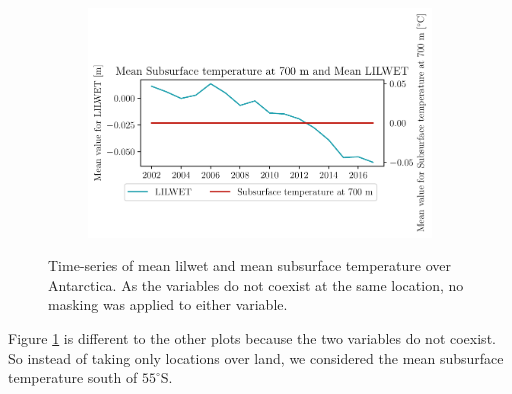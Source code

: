 \documentclass[../main.tex]{subfiles}
\begin{document}
\begin{figure}[hbt!]
\begin{subfigure}[b]{0.45\textwidth}
    \end{subfigure}
    \begin{subfigure}[b]{0.45\textwidth}
    \includegraphics[width=\textwidth]{images/2021w5/chapter7/hres/tiemseries_subsurtemp_700_LIC}
    \end{subfigure}
    \caption{Time-series of mean \gls{lilwet} and mean subsurface temperature over Antarctica. As the variables do not coexist at the same location, no masking was applied to either variable.}
    \label{fig:timeseries_subsurtemp_100}
\end{figure}

Figure \ref{fig:timeseries_subsurtemp_100} is different to the other plots because the two variables do not coexist. So instead of taking only locations over land, we considered the mean subsurface temperature south of $55^\circ$S. 
\end{document}
